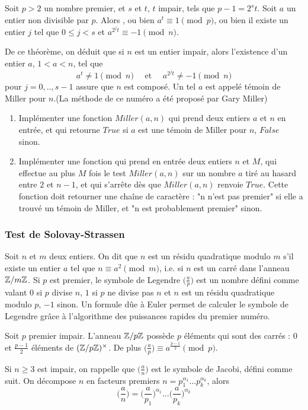 \begin{thm} Soit $p>2$ un nombre premier, et $s$ et $t$, $t$ impair, tels que $p-1=2^s t $. Soit $a$ un entier non divisible par $p$. Alors , ou bien $a^t \equiv 1\pmod p$, ou bien il existe un entier $j$ tel que $0\leq j < s $ et $a^{2^j t} \equiv -1\pmod n$.
\end{thm}
De ce théorème, on déduit que si $n$ est un entier impair, alors l'existence d'un entier $a$, $1<a<n$, tel que 
\[a^t\neq 1\pmod n \quad\text{ et }\quad a^{2^j t}\neq -1\pmod n\]
pour $j=0,..,s-1$ assure que $n$ est composé. Un tel $a$ est appelé témoin de Miller pour $n$.(La méthode de ce numéro a été proposé par Gary Miller)
\begin{enumerate}
\item Implémenter une fonction $Miller(a,n)$ qui prend deux entiers $a$ et $n$ en entrée, et qui retourne $True$ si $a$ est une témoin de Miller pour $n$, $False$ sinon.
\item Implémenter une fonction qui prend en entrée deux entiers $n$ et $M$, qui effectue au plus $M$ fois le test $Miller(a,n)$ sur un nombre $a$ tiré au hasard entre $2$ et $n-1$, et qui s'arrête dès que $Miller(a,n)$ renvoie $True$. Cette fonction doit retourner une chaîne de caractère : "n n'est pas premier" si elle a trouvé un témoin de Miller, et "n est probablement premier" sinon.
\end{enumerate}

\subsubsection{Test de Solovay-Strassen}
Soit $n$ et $m$ deux entiers. On dit que $n$ est un résidu quadratique modulo $m$ s'il existe un entier $a$ tel que $n\equiv a^2\pmod m$, i.e. si $n$ est un carré dans l'anneau $\mathbb Z/m\mathbb Z$. Si $p$ est premier, le symbole de Legendre $\big(\frac{a}{p}\big)$ est un nombre défini comme valant $0$ si $p$ divise $n$, $1$ si $p$ ne divise pas $n$ et $n$ est un résidu quadratique modulo $p$, $-1$ sinon. Un formule dûe à Euler permet de calculer le symbole de Legendre grâce à l'algorithme des puissances rapides du premier numéro.

\begin{prop}[Euler]
Soit $p$ premier impair. L'anneau $\mathbb Z/p\mathbb Z$ possède $p$ éléments qui sont des carrés : $0$ et $\frac{p-1}{2}$ éléments de $(\mathbb Z/p\mathbb Z)^\times$. De plus $\big(\frac{a}{p}\big)\equiv a^{\frac{p-1}{2}}\pmod p$.
\end{prop}

Si $n\geq 3$ est impair, on rappelle que $\big(\frac{a}{n}\big)$ est le symbole de Jacobi, défini comme suit. On décompose $n$ en facteurs premiers $n=p_1^{\alpha_1}...p_k^{\alpha_k}$, alors 
\[\big(\frac{a}{n}\big)=\big(\frac{a}{p_1}\big)^{\alpha_1}...\big(\frac{a}{p_k}\big)^{\alpha_k}\]


